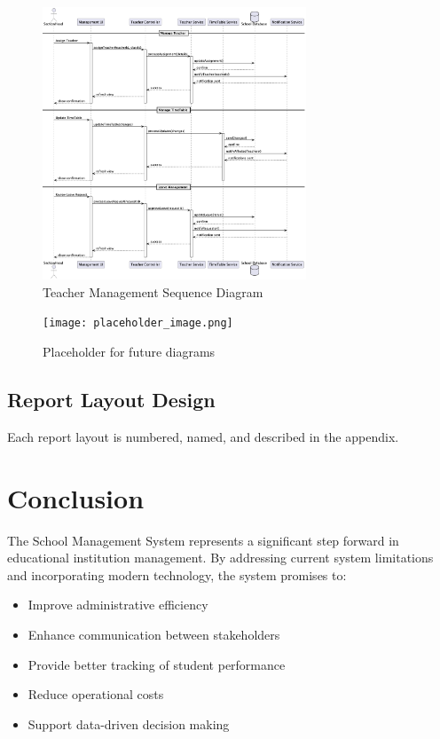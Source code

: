\documentclass[12pt,a4paper]{report}
\begin{document}
\begin{figure}[h]
    \centering
    \includegraphics[width=0.7\textwidth]{teacher-sequence.png}
    \caption{Teacher Management Sequence Diagram}
    \label{fig:teacher-sequence}
\end{figure}

\begin{figure}[h]
    \centering
    \texttt{[image: placeholder\_image.png]}
    \caption{Placeholder for future diagrams}
\end{figure}

\section{Report Layout Design}
Each report layout is numbered, named, and described in the appendix.

\chapter{Conclusion}
The School Management System represents a significant step forward in educational institution management. By addressing current system limitations and incorporating modern technology, the system promises to:
\begin{itemize}
    \item Improve administrative efficiency
    \item Enhance communication between stakeholders
    \item Provide better tracking of student performance
    \item Reduce operational costs
    \item Support data-driven decision making
\end{itemize}
\end{document}
